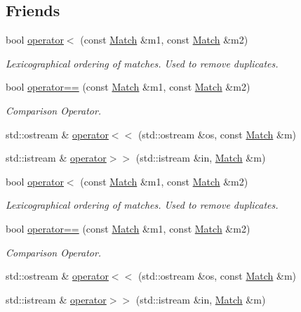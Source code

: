 \subsection*{Friends}
\begin{DoxyCompactItemize}
\item 
bool \hyperlink{structMatch_a40635809cb7add083b19dbcb17d08068}{operator$<$} (const \hyperlink{structMatch}{Match} \&m1, const \hyperlink{structMatch}{Match} \&m2)
\begin{DoxyCompactList}\small\item\em Lexicographical ordering of matches. Used to remove duplicates. \end{DoxyCompactList}\item 
bool \hyperlink{structMatch_ac6894d6e77a5126b8452f57f6733dfe1}{operator==} (const \hyperlink{structMatch}{Match} \&m1, const \hyperlink{structMatch}{Match} \&m2)
\begin{DoxyCompactList}\small\item\em Comparison Operator. \end{DoxyCompactList}\item 
std\+::ostream \& \hyperlink{structMatch_ac88305bd4206fd892a4830eb695d34c1}{operator$<$$<$} (std\+::ostream \&os, const \hyperlink{structMatch}{Match} \&m)
\item 
std\+::istream \& \hyperlink{structMatch_afbe52fcdb5652281b46654fda95c1e2c}{operator$>$$>$} (std\+::istream \&in, \hyperlink{structMatch}{Match} \&m)
\item 
bool \hyperlink{structMatch_a40635809cb7add083b19dbcb17d08068}{operator$<$} (const \hyperlink{structMatch}{Match} \&m1, const \hyperlink{structMatch}{Match} \&m2)
\begin{DoxyCompactList}\small\item\em Lexicographical ordering of matches. Used to remove duplicates. \end{DoxyCompactList}\item 
bool \hyperlink{structMatch_ac6894d6e77a5126b8452f57f6733dfe1}{operator==} (const \hyperlink{structMatch}{Match} \&m1, const \hyperlink{structMatch}{Match} \&m2)
\begin{DoxyCompactList}\small\item\em Comparison Operator. \end{DoxyCompactList}\item 
std\+::ostream \& \hyperlink{structMatch_ac88305bd4206fd892a4830eb695d34c1}{operator$<$$<$} (std\+::ostream \&os, const \hyperlink{structMatch}{Match} \&m)
\item 
std\+::istream \& \hyperlink{structMatch_afbe52fcdb5652281b46654fda95c1e2c}{operator$>$$>$} (std\+::istream \&in, \hyperlink{structMatch}{Match} \&m)
\end{DoxyCompactItemize}


